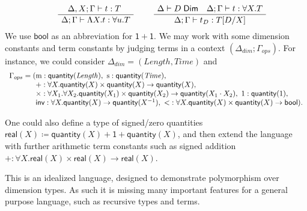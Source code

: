 \documentclass[a4paper,UKenglish]{lipics}
\newcommand{\msf}[1]{\mathsf{#1}} %
\newcommand{\unitTy}{\msf{1}}
\newcommand{\qnt}{\msf{quantity}}
\newcommand{\sreal}{\msf{real}}
\newcommand{\bool}{\msf{bool}}
\newcommand{\lengthDim}{\mathit{Length}}
\newcommand{\timeDim}{\mathit{Time}}
\newcommand{\Deltadim}{\ensuremath{\Delta_{dim}}}
\newcommand{\Gammaops}{\ensuremath{\Gamma_{ops}}}
\newcommand{\Dj}[2]{#1 \vdash #2 \; \msf{ Dim}}
\newcommand{\tj}[4]{#1;#2 \vdash #3 : #4}
\newcommand{\pack}[2]{\mathsf{pack}(#1,#2)}
\newcommand{\unpack}[4]{\mathsf{unpack}\,#1\,\mathsf{as}\,(#2,#3)\,\mathsf{in}\,#4}
\newcommand{\Dim}{D}
\newcommand{\Dvar}{X}
\begin{document}
\[\begin{array}{cc}
\hspace{5mm}
\AxiomC{$\tj{\Delta,\Dvar}\Gamma tT$ }
		\UnaryInfC{$\tj \Delta  \Gamma {\Lambda \Dvar.t} {\forall u.T}$}
		\DisplayProof

&\hspace{5mm}
\AxiomC{$\Dj\Delta \Dim \quad \tj \Delta \Gamma  t{\forall \Dvar.T}$}
	\UnaryInfC{$\tj \Delta  \Gamma {t_\Dim}{T[\Dim/\Dvar]}$}
	\DisplayProof
%
\end{array}\]
%
We use $\bool$ as an abbreviation for $\unitTy + \unitTy$.
We may work with some dimension constants and term constants
by judging terms in a context $(\Deltadim;\Gammaops)$.
For instance, we could consider $\Deltadim = (\lengthDim, \timeDim)$ and
\[\begin{array}{r@{}l}\Gammaops = (
&\mathrm{m}:\qnt(\lengthDim),
\ \mathrm{s}:\qnt(\timeDim),
\\&+:\forall \Dvar. \qnt(\Dvar)\times  \qnt(\Dvar) \rightarrow \qnt(\Dvar),
\\&\times :\forall \Dvar_1. \forall \Dvar_2. \qnt(\Dvar_1)\times \qnt(\Dvar_2) \rightarrow \qnt(\Dvar_1 \cdot \Dvar_2),
\ 1:\qnt(1),
\\&\mathsf{inv}:\forall \Dvar.\qnt(\Dvar)\to \qnt (\Dvar^{-1}),
\ {<}:\forall \Dvar.\qnt(\Dvar)\times \qnt(\Dvar)\to \bool)\text.
\end{array}\]

One could also define a type of signed/zero quantities $\sreal(\Dvar)\coloneqq \qnt(\Dvar)+\unitTy+\qnt(\Dvar)$, and then extend the language with further arithmetic term constants such as signed addition $+:\forall \Dvar.\sreal(\Dvar)\times \sreal(\Dvar)\to\sreal(\Dvar)$.


This is an idealized language, designed to demonstrate polymorphism over dimension types. As such it is missing many important features for a general purpose language, such as recursive types and terms.
\end{document}
